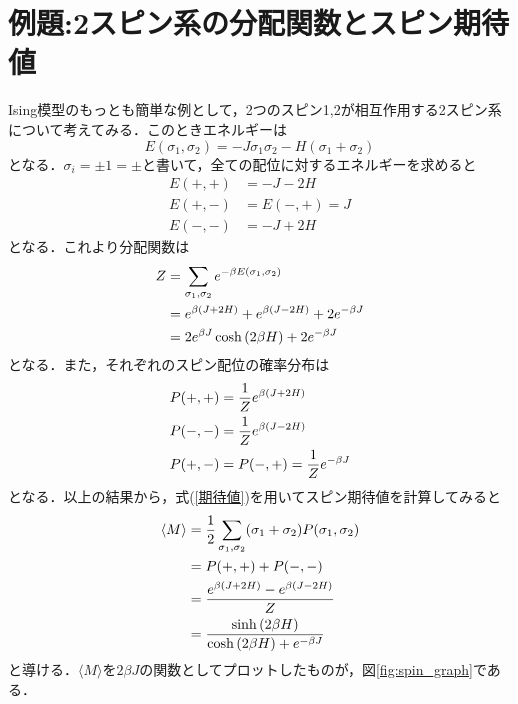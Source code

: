 \documentclass[a4paper,11pt]{jsarticle}
\begin{document}
\section*{例題:2スピン系の分配関数とスピン期待値}
Ising模型のもっとも簡単な例として，2つのスピン1,2が相互作用する2スピン系について考えてみる．このときエネルギーは
\begin{equation}
  E(\sigma_1, \sigma_2) = -J\sigma_1 \sigma_2 -H(\sigma_1 + \sigma_2)
\end{equation}
となる．$\sigma_i = \pm 1 = \pm$と書いて，全ての配位に対するエネルギーを求めると
\begin{align}
  E(+,+) & = -J -2H     \\
  E(+,-) & = E(-,+) = J \\
  E(-,-) & = -J +2H
\end{align}
となる．これより分配関数は
\begin{align}
  Z
   & = \sum_{\sigma_1,\sigma_2} e^{-\beta E(\sigma_1, \sigma_2)} \notag \\
   & = e^{\beta(J+2H)} + e^{\beta(J-2H)} + 2e^{-\beta J} \notag         \\
   & = 2e^{\beta J}\cosh{(2\beta H)} + 2e^{-\beta J} \label{eq:分配関数}
\end{align}
となる．また，それぞれのスピン配位の確率分布は
\begin{align}
  P(+,+) & = \frac{1}{Z} e^{\beta(J + 2H)} \notag \\
  P(-,-) & = \frac{1}{Z} e^{\beta(J - 2H)} \notag \\
  P(+,-) & = P(-,+) = \frac{1}{Z} e^{-\beta J}
\end{align}
となる．以上の結果から，式(\ref{期待値})を用いてスピン期待値を計算してみると
\begin{align}
  \langle M \rangle
   & = \frac{1}{2}\sum_{\sigma_1,\sigma_2}(\sigma_1 + \sigma_2)P(\sigma_1, \sigma_2) \notag \\
   & = P(+,+) + P(-,-) \notag                                                               \\
   & = \frac{e^{\beta(J + 2H)} - e^{\beta(J - 2H)}}{Z} \notag                               \\
   & = \frac{\sinh{(2\beta H)}}{\cosh{(2\beta H)} + e^{-\beta J}} \label{eq:スピン期待値}
\end{align}
と導ける．$\langle M \rangle$を$2\beta J$の関数としてプロットしたものが，図\ref{fig:spin_graph}である．\par
\end{document}
